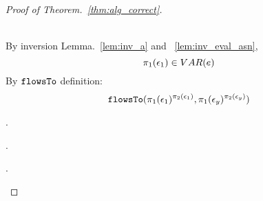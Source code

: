 \begin{proof}[Proof of Theorem.~\ref{thm:alg_correct}]
\begin{case}
\begin{subcase}
\begin{subsubcase}
%
\\
By inversion Lemma.~\ref{lem:inv_a} and ~\ref{lem:inv_eval_asn}, 
\[
  \pi_1(\mathtt{\epsilon}_1) \in VAR(e)
\]
%
By $\mathtt{flowsTo}$ definition:
\[
  \mathtt{flowsTo}(\pi_1(\mathtt{\epsilon}_1)^{\pi_2(\mathtt{\epsilon}_1)}, \pi_1(\mathtt{\epsilon}_y)^{\pi_2(\mathtt{\epsilon}_y)})
\]
%
\end{subsubcase}
%
\end{subcase}
%
\begin{subcase}.
%
\end{subcase}
%
\begin{subcase}.
%
\end{subcase}
%
\begin{subcase}.
%
\end{subcase}
%
\end{case}
%
\end{proof}